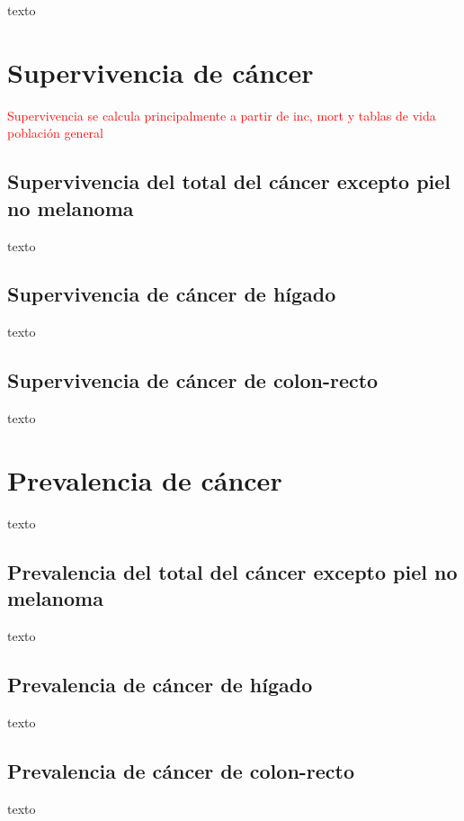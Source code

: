 texto

\section{Supervivencia de cáncer} 

\textcolor{red}{Supervivencia se calcula principalmente a partir de inc, mort y tablas de vida población general}

\subsection{Supervivencia del total del cáncer excepto piel no melanoma}

texto

\subsection{Supervivencia de cáncer de hígado}

texto

\subsection{Supervivencia de cáncer de colon-recto}

texto

\section{Prevalencia de cáncer}

texto

\subsection{Prevalencia del total del cáncer excepto piel no melanoma}

texto

\subsection{Prevalencia de cáncer de hígado}

texto

\subsection{Prevalencia de cáncer de colon-recto}

texto






